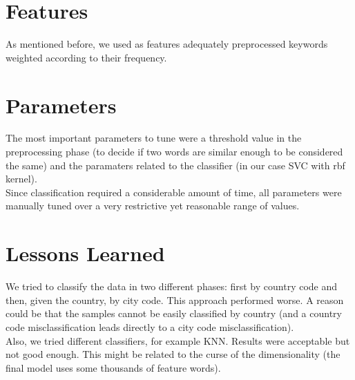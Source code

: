 \documentclass[a4paper, 11pt]{article}
\begin{document}
\section{Features}
As mentioned before, we used as features adequately preprocessed keywords weighted according
to their frequency.

\section{Parameters}
The most important parameters to tune were a threshold value in the preprocessing phase (to decide 
if two words are similar enough to be considered the same) and the paramaters related to the classifier
(in our case SVC with rbf kernel).\\
Since classification required a considerable amount of time, all parameters were manually tuned over a
very restrictive yet reasonable range of values.

\section{Lessons Learned} 
We tried to classify the data in two different phases: first by country code and then, given the country, 
by city code. This approach performed worse. A reason could be that the samples cannot be easily classified 
by country (and a country code misclassification leads directly to a city code misclassification).\\
Also, we tried different classifiers, for example KNN. Results were acceptable but not good enough.
This might be related to the curse of the dimensionality (the final model uses some thousands of feature words).
\end{document}
